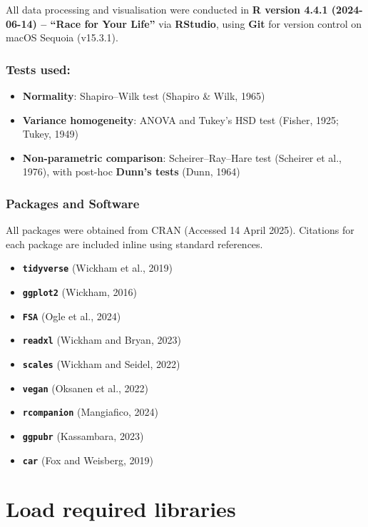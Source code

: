 \documentclass[
]{article}
\providecommand{\tightlist}{%
  \setlength{\itemsep}{0pt}\setlength{\parskip}{0pt}}
\begin{document}
All data processing and visualisation were conducted in \textbf{R
version 4.4.1 (2024-06-14) -- ``Race for Your Life''} via
\textbf{RStudio}, using \textbf{Git} for version control on macOS
Sequoia (v15.3.1).

\subsubsection{Tests used:}\label{tests-used}

\begin{itemize}
\tightlist
\item
  \textbf{Normality}: Shapiro--Wilk test (Shapiro \& Wilk, 1965)
\item
  \textbf{Variance homogeneity}: ANOVA and Tukey's HSD test (Fisher,
  1925; Tukey, 1949)
\item
  \textbf{Non-parametric comparison}: Scheirer--Ray--Hare test (Scheirer
  et al., 1976), with post-hoc \textbf{Dunn's tests} (Dunn, 1964)
\end{itemize}

\subsubsection{Packages and Software}\label{packages-and-software}

All packages were obtained from CRAN (Accessed 14 April 2025). Citations
for each package are included inline using standard references.

\begin{itemize}
\tightlist
\item
  \textbf{\texttt{tidyverse}} (Wickham et al., 2019)
\item
  \textbf{\texttt{ggplot2}} (Wickham, 2016)
\item
  \textbf{\texttt{FSA}} (Ogle et al., 2024)
\item
  \textbf{\texttt{readxl}} (Wickham and Bryan, 2023)
\item
  \textbf{\texttt{scales}} (Wickham and Seidel, 2022)
\item
  \textbf{\texttt{vegan}} (Oksanen et al., 2022)
\item
  \textbf{\texttt{rcompanion}} (Mangiafico, 2024)
\item
  \textbf{\texttt{ggpubr}} (Kassambara, 2023)
\item
  \textbf{\texttt{car}} (Fox and Weisberg, 2019)
\end{itemize}

\section{Load required libraries}\label{load-required-libraries}
\end{document}
